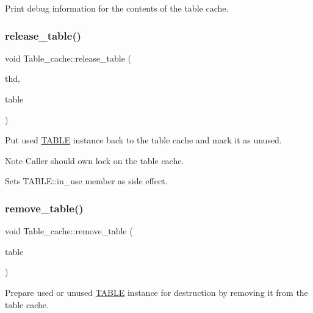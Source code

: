 Print debug information for the contents of the table cache. \mbox{\label{classTable__cache_a44a41982d66f7084599befd4ad92f1b9}} 
\subsubsection{\texorpdfstring{release\+\_\+table()}{release\_table()}}
{\footnotesize\ttfamily void Table\+\_\+cache\+::release\+\_\+table (\begin{DoxyParamCaption}\item[{T\+HD $\ast$}]{thd,  }\item[{\mbox{\hyperlink{structTABLE}{T\+A\+B\+LE}} $\ast$}]{table }\end{DoxyParamCaption})\hspace{0.3cm}{\ttfamily [inline]}}

Put used \mbox{\hyperlink{structTABLE}{T\+A\+B\+LE}} instance back to the table cache and mark it as unused.

\begin{DoxyNote}{Note}
Caller should own lock on the table cache. 

Sets T\+A\+B\+L\+E\+::in\+\_\+use member as side effect. 
\end{DoxyNote}
\mbox{\label{classTable__cache_ae6ac88435d0e282a272cb76836a68e7f}} 
\subsubsection{\texorpdfstring{remove\+\_\+table()}{remove\_table()}}
{\footnotesize\ttfamily void Table\+\_\+cache\+::remove\+\_\+table (\begin{DoxyParamCaption}\item[{\mbox{\hyperlink{structTABLE}{T\+A\+B\+LE}} $\ast$}]{table }\end{DoxyParamCaption})\hspace{0.3cm}{\ttfamily [inline]}}

Prepare used or unused \mbox{\hyperlink{structTABLE}{T\+A\+B\+LE}} instance for destruction by removing it from the table cache.


